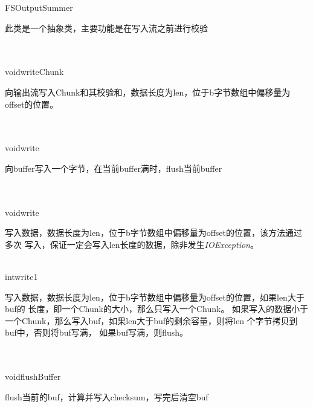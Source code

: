 \begin{XeClass}{FSOutputSummer}
   
 此类是一个抽象类，主要功能是在写入流之前进行校验

  \begin{XeMethod}{\XeProtected\\ \XeAbstract\\ }{void}{writeChunk}
       
 向输出流写入Chunk和其校验和，数据长度为len，位于b字节数组中偏移量为offset的位置。

  \end{XeMethod}

  \begin{XeMethod}{\XePublic\\ \XeSync\\ }{void}{write}
       
 向buffer写入一个字节，在当前buffer满时，flush当前buffer

  \end{XeMethod}

  \begin{XeMethod}{\XePublic\\ \XeSync\\ }{void}{write}
       
 写入数据，数据长度为len，位于b字节数组中偏移量为offset的位置，该方法通过多次
 写入，保证一定会写入len长度的数据，除非发生\emph{IOException}。

  \end{XeMethod}

  \begin{XeMethod}{\XePrivate\\ }{int}{write1}
       
 写入数据，数据长度为len，位于b字节数组中偏移量为offset的位置，如果len大于buf的
 长度，即一个Chunk的大小，那么只写入一个Chunk。
 如果写入的数据小于一个Chunk，那么写入buf，如果len大于buf的剩余容量，则将len
 个字节拷贝到buf中，否则将buf写满，
 如果buf写满，则flush。

  \end{XeMethod}

  \begin{XeMethod}{\XeProtected\\ \XeSync\\ }{void}{flushBuffer}
       
 flush当前的buf，计算并写入checksum，写完后清空buf

  \end{XeMethod}


\end{XeClass}
